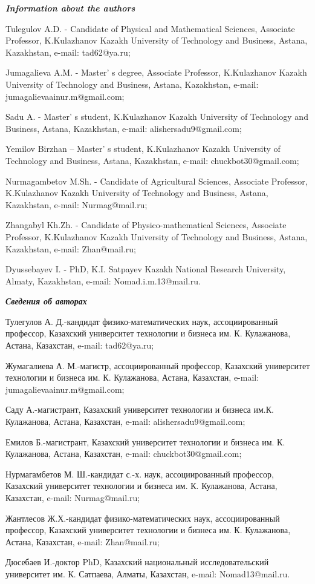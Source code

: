 \begin{info}
\hspace{1em}\emph{{\bfseries Information about the authors}}

Tulegulov A.D. - Candidate of Physical and Mathematical Sciences,
Associate Professor, K.Kulazhanov Kazakh University of Technology and
Business, Astana, Kazakhstan, e-mail:
tad62@ya.ru;

Jumagalieva A.M. - Master' s degree, Associate Professor,
K.Kulazhanov Kazakh University of Technology and Business, Astana,
Kazakhstan, e-mail:
jumagalievaainur.m@gmail.com;

Sadu A. - Master' s student, K.Kulazhanov Kazakh
University of Technology and Business, Astana, Kazakhstan, e-mail:
alishersadu9@gmail.com;

Yemilov Birzhan -- Master' s student, K.Kulazhanov Kazakh
University of Technology and Business, Astana, Kazakhstan, e-mail:
chuckbot30@gmail.com;

Nurmagambetov M.Sh. - Candidate of Agricultural Sciences, Associate
Professor, K.Kulazhanov Kazakh University of Technology and Business,
Astana, Kazakhstan, e-mail:
Nurmag@mail.ru;

Zhangabyl Kh.Zh. - Candidate of Physico-mathematical Sciences, Associate
Professor, K.Kulazhanov Kazakh University of Technology and Business,
Astana, Kazakhstan, e-mail:
Zhan@mail.ru;

Dyussebayev I. - PhD, K.I. Satpayev Kazakh National Research University,
Almaty, Kazakhstan, e-mail:
Nomad.i.m.13@mail.ru.

\hspace{1em}\emph{{\bfseries Сведения об авторах}}

Тулегулов А. Д.-кандидат физико-математических наук, ассоциированный
профессор, Казахский университет технологии и бизнеса им. К. Кулажанова,
Астана, Казахстан, e-mail: tad62@ya.ru;

Жумагалиева А. М.-магистр, ассоциированный профессор, Казахский
университет технологии и бизнеса им. К. Кулажанова, Астана, Казахстан,
e-mail: jumagalievaainur.m@gmail.com;

Саду А.-магистрант, Казахский университет технологии и бизнеса им.К.
Кулажанова, Астана, Казахстан, e-mail: alishersadu9@gmail.com;

Емилов Б.-магистрант, Казахский университет технологии и бизнеса им. К.
Кулажанова, Астана, Казахстан, e-mail: chuckbot30@gmail.com;

Нурмагамбетов М. Ш.-кандидат с.-х. наук, ассоциированный профессор,
Казахский университет технологии и бизнеса им. К. Кулажанова, Астана,
Казахстан, e-mail: Nurmag@mail.ru;

Жантлесов Ж.Х.-кандидат физико-математических наук, ассоциированный
профессор, Казахский университет технологии и бизнеса им. К. Кулажанова,
Астана, Казахстан, e-mail: Zhan@mail.ru;

Дюсебаев И.-доктор PhD, Казахский национальный исследовательский
университет им. К. Сатпаева, Алматы, Казахстан, e-mail: Nomad13@mail.ru.
\end{info}
